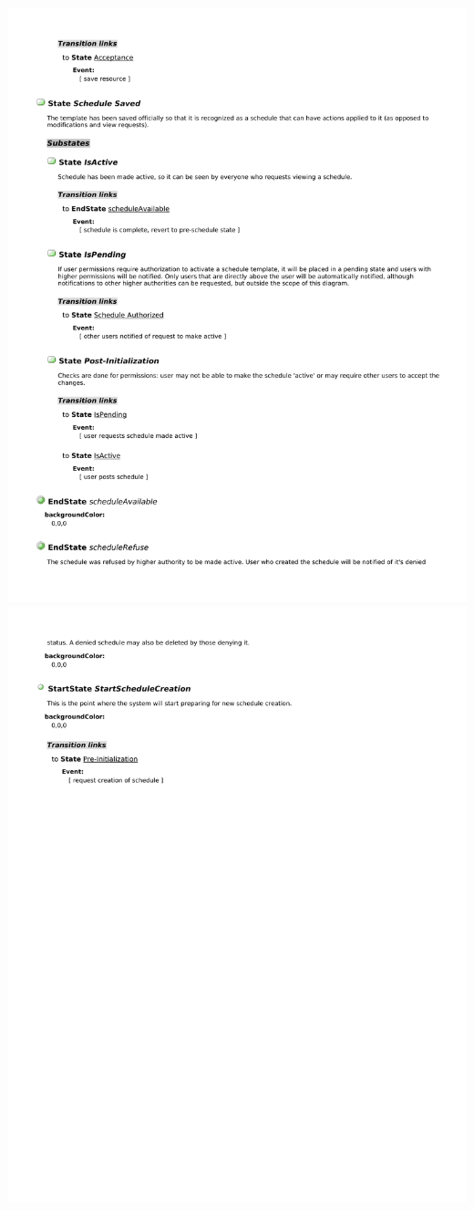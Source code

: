 \documentclass[letterpaper,12pt]{report}
\begin{document}
\newpage
\includegraphics[scale=0.9, trim=20mm 30mm 25mm 20mm]{externals/NewSchedState4.pdf}
\newpage
\includegraphics[scale=0.9,trim=20mm 30mm 25mm 20mm]{externals/NewSchedState5.pdf}
\end{document}
